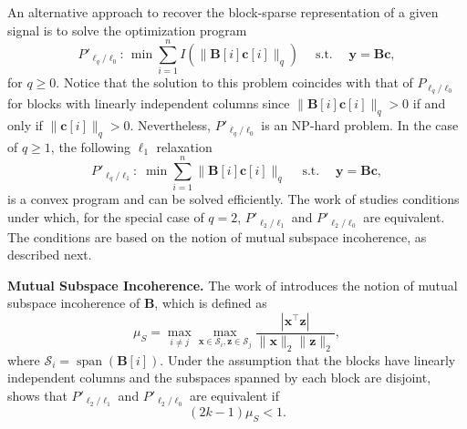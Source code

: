 \documentclass[10pt,twocolumn,twoside] {IEEEtran}
\begin{document}
An alternative approach to recover the block-sparse representation of a given signal is to solve the optimization program 
\begin{equation}
\label{eq:L2L0-B}
P'_{\ell_q/\ell_0}\!\!: \, \min \sum_{i=1}^{n}{I(\| {\boldsymbol{B}}[i] {\boldsymbol{c}}[i] \|_q)} \quad {\operatorname{s. t.}} \quad {\boldsymbol{y}} = {\boldsymbol{B}} {\boldsymbol{c}},\!
\end{equation}
for $q \geq 0$. Notice that the solution to this problem coincides with that of $P_{\ell_q/\ell_0}$ for blocks with linearly independent columns since $\| {\boldsymbol{B}}[i] {\boldsymbol{c}}[i] \|_q > 0$ if and only if $\| {\boldsymbol{c}}[i] \|_q > 0$. Nevertheless, $P'_{\ell_q/\ell_0}$ is an NP-hard problem. In the case of $q \geq 1$, the following $\ell_1$ relaxation 
\begin{equation}
\label{eq:L2L1-B}
P'_{\ell_q/\ell_1}: \; \min \sum_{i=1}^{n}{\| {\boldsymbol{B}}[i] {\boldsymbol{c}}[i] \|_q} \quad {\operatorname{s. t.}} \quad {\boldsymbol{y}} = {\boldsymbol{B}} {\boldsymbol{c}},
\end{equation}
is a convex program and can be solved efficiently. The work of  \cite{Ganesh:ICASSP09} studies conditions under which, for the special case of $q=2$, $P'_{\ell_2/\ell_1}$ and $P'_{\ell_2/\ell_0}$ are equivalent. The conditions are based on the notion of mutual subspace incoherence, as described next.

{\medskip\noindent\textbf{{Mutual Subspace Incoherence}.} } The work of  \cite{Ganesh:ICASSP09} introduces the notion of mutual subspace incoherence of ${\boldsymbol{B}}$, which is defined as
\begin{equation}
\mu_S = \max_{i \neq j} \max_{{{\mathbf x}} \in \mathcal{S}_i, {\boldsymbol{z}} \in \mathcal{S}_j} \frac{| {{\mathbf x}}^{\top} {\boldsymbol{z}} |}{ \| {{\mathbf x}} \|_2  \| {\boldsymbol{z}} \|_2 },
\end{equation}
where ${\mathcal{S}}_i = {\operatorname{span}}({\boldsymbol{B}}[i])$. Under the assumption that the blocks have  linearly independent columns and the subspaces spanned by each block are disjoint, \cite{Ganesh:ICASSP09} shows that $P'_{\ell_2/\ell_1}$  and $P'_{\ell_2/\ell_0}$ are equivalent if
\begin{equation}
(2k-1) \mu_S < 1.
\end{equation}
\end{document}
